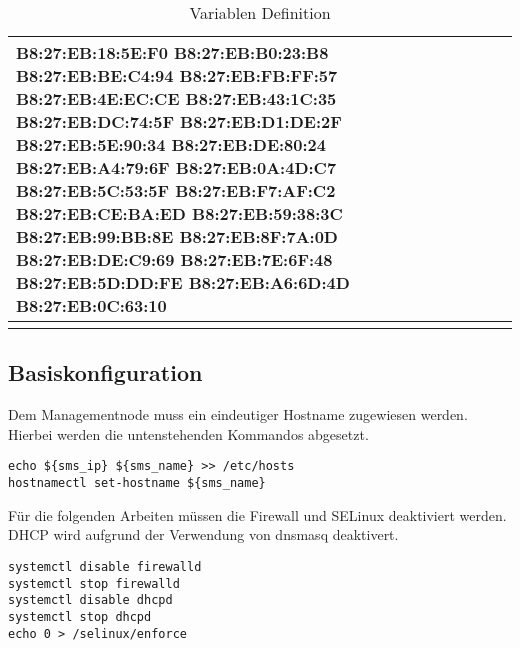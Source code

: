 \begin{longtable}{| p{0.5cm} | p{3cm} | p{8.5cm} | p{4cm} |}
\newline B8:27:EB:18:5E:F0 \newline B8:27:EB:B0:23:B8 \newline B8:27:EB:BE:C4:94 \newline B8:27:EB:FB:FF:57 \newline B8:27:EB:4E:EC:CE \newline 	B8:27:EB:43:1C:35 \newline B8:27:EB:DC:74:5F \newline B8:27:EB:D1:DE:2F \newline B8:27:EB:5E:90:34 \newline B8:27:EB:DE:80:24 \newline B8:27:EB:A4:79:6F \newline B8:27:EB:0A:4D:C7 \newline B8:27:EB:5C:53:5F \newline B8:27:EB:F7:AF:C2 \newline B8:27:EB:CE:BA:ED \newline B8:27:EB:59:38:3C \newline B8:27:EB:99:BB:8E \newline B8:27:EB:8F:7A:0D \newline B8:27:EB:DE:C9:69 \newline B8:27:EB:7E:6F:48 \newline B8:27:EB:5D:DD:FE
\newline B8:27:EB:A6:6D:4D \newline B8:27:EB:0C:63:10\\\hline 

\caption{Variablen Definition}
\end{longtable}

\subsection{Basiskonfiguration}
Dem Managementnode muss ein eindeutiger Hostname zugewiesen werden. Hierbei werden die untenstehenden Kommandos abgesetzt.

\begin{lstlisting}
echo ${sms_ip} ${sms_name} >> /etc/hosts
hostnamectl set-hostname ${sms_name}
\end{lstlisting}

Für die folgenden Arbeiten müssen die Firewall und SELinux deaktiviert werden. DHCP wird aufgrund der Verwendung von dnsmasq deaktivert.

\begin{lstlisting}
systemctl disable firewalld
systemctl stop firewalld
systemctl disable dhcpd
systemctl stop dhcpd
echo 0 > /selinux/enforce
\end{lstlisting}

